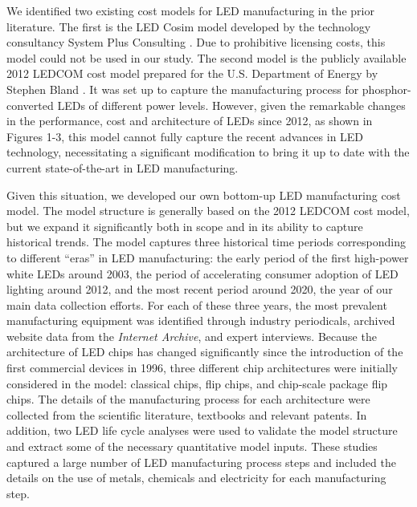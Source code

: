 \documentclass[journal=jacsat,manuscript=article]{achemso}
\begin{document}
We identified two existing cost models for LED manufacturing in the prior literature. The first is the LED Cosim model developed by the technology consultancy System Plus Consulting \cite{cosim2013} \cite{cosim2019}. Due to prohibitive licensing costs, this model could not be used in our study. The second model is the publicly available 2012 LEDCOM cost model prepared for the U.S. Department of Energy by Stephen Bland  \cite{ledcomv2}. It was set up to capture the manufacturing process for phosphor-converted LEDs of different power levels. However, given the remarkable changes in the performance, cost and architecture of LEDs since 2012, as shown in Figures 1-3, this model cannot fully capture the recent advances in LED technology, necessitating a significant modification to bring it up to date with the current state-of-the-art in LED manufacturing.   

Given this situation, we developed our own bottom-up LED manufacturing cost model. The model structure is generally based on the 2012 LEDCOM cost model, but we expand it significantly both in scope and in its ability to capture historical trends. The model captures three historical time periods corresponding to different “eras” in LED manufacturing: the early period of the first high-power white LEDs around 2003, the period of accelerating consumer adoption of LED lighting around 2012, and the most recent period around 2020, the year of our main data collection efforts. For each of these three years, the most prevalent manufacturing equipment was identified through industry periodicals, archived website data from the \textit{Internet Archive}, and expert interviews. Because the architecture of LED chips has changed significantly since the introduction of the first commercial devices in 1996, three different chip architectures were initially considered in the model: classical chips, flip chips, and chip-scale package flip chips. The details of the manufacturing process for each architecture were collected from the scientific literature, textbooks and relevant patents. In addition, two LED life cycle analyses \cite{scholand2012life}\cite{casamayor2018comparative} were used to validate the model structure and extract some of the necessary quantitative model inputs. These studies captured a large number of LED manufacturing process steps and included the details on the use of metals, chemicals and electricity for each manufacturing step.
\end{document}
